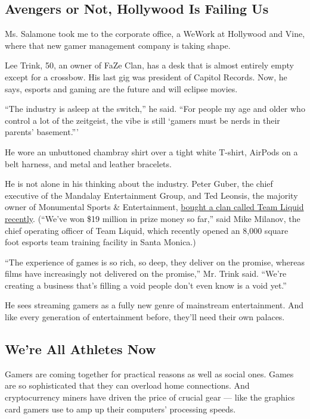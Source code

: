 \hypertarget{avengers-or-not-hollywood-is-failing-us}{%
\subsection{Avengers or Not, Hollywood Is Failing
Us}\label{avengers-or-not-hollywood-is-failing-us}}

Ms. Salamone took me to the corporate office, a WeWork at Hollywood and
Vine, where that new gamer management company is taking shape.

Lee Trink, 50, an owner of FaZe Clan, has a desk that is almost entirely
empty except for a crossbow. His last gig was president of Capitol
Records. Now, he says, esports and gaming are the future and will
eclipse movies.

``The industry is asleep at the switch,'' he said. ``For people my age
and older who control a lot of the zeitgeist, the vibe is still `gamers
must be nerds in their parents' basement.'''

He wore an unbuttoned chambray shirt over a tight white T-shirt, AirPods
on a belt harness, and metal and leather bracelets.

He is not alone in his thinking about the industry. Peter Guber, the
chief executive of the Mandalay Entertainment Group, and Ted Leonsis,
the majority owner of Monumental Sports \& Entertainment,
\href{https://deadline.com/2016/09/peter-guber-ted-leonsis-lead-group-buy-control-esports-team-liquid-1201826800/}{bought
a clan called Team Liquid recently}. (``We've won \$19 million in prize
money so far,'' said Mike Milanov, the chief operating officer of Team
Liquid, which recently opened an 8,000 square foot esports team training
facility in Santa Monica.)

``The experience of games is so rich, so deep, they deliver on the
promise, whereas films have increasingly not delivered on the promise,''
Mr. Trink said. ``We're creating a business that's filling a void people
don't even know is a void yet.''

He sees streaming gamers as a fully new genre of mainstream
entertainment. And like every generation of entertainment before,
they'll need their own palaces.

\hypertarget{were-all-athletes-now}{%
\subsection{We're All Athletes Now}\label{were-all-athletes-now}}

Gamers are coming together for practical reasons as well as social ones.
Games are so sophisticated that they can overload home connections. And
cryptocurrency miners have driven the price of crucial gear --- like the
graphics card gamers use to amp up their computers' processing speeds.


